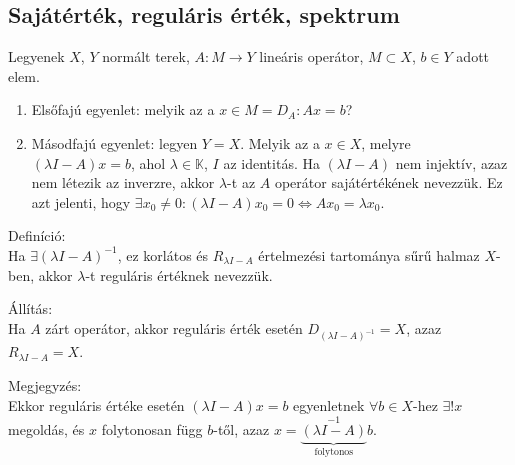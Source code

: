 \documentclass[12pt,a4paper]{scrartcl}
\providecommand{\tightlist}{%
  \setlength{\itemsep}{0pt}\setlength{\parskip}{0pt}}
\newenvironment{definicio}{}{}
\newenvironment{allitas}{}{}
\newenvironment{megjegyzes}{}{}
\begin{document}
\hypertarget{sajatertek-regularis-ertek-spektrum}{%
\subsection{Sajátérték, reguláris érték,
spektrum}\label{sajatertek-regularis-ertek-spektrum}}

Legyenek \(X\), \(Y\) normált terek, \(\left. A:M\rightarrow Y \right.\)
lineáris operátor, \(M \subset X\), \(b \in Y\) adott elem.

\begin{enumerate}
\def\labelenumi{\arabic{enumi}.}
\tightlist
\item
  Elsőfajú egyenlet: melyik az a \(x \in M = D_{A}:Ax = b\)?
\item
  Másodfajú egyenlet: legyen \(Y = X\). Melyik az a \(x \in X\), melyre
  \(\left( {\lambda I - A} \right)x = b\), ahol
  \(\lambda \in {\mathbb{K}}\), \(I\) az identitás. Ha
  \(\left( {\lambda I - A} \right)\) nem injektív, azaz nem létezik az
  inverzre, akkor \(\lambda\)-t az \(A\) operátor sajátértékének
  nevezzük. Ez azt jelenti, hogy
  \(\left. \exists x_{0} \neq 0:\left( {\lambda I - A} \right)x_{0} = 0\Leftrightarrow Ax_{0} = \lambda x_{0} \right.\).
\end{enumerate}

\begin{definicio}

Definíció:\\
Ha \(\exists\left( {\lambda I - A} \right)^{- 1}\), ez korlátos és
\(R_{\lambda I - A}\) értelmezési tartománya sűrű halmaz \(X\)-ben,
akkor \(\lambda\)-t reguláris értéknek nevezzük.

\end{definicio}

\begin{allitas}

Állítás:\\
Ha \(A\) zárt operátor, akkor reguláris érték esetén
\(D_{{({\lambda I - A})}^{- 1}} = X\), azaz \(R_{\lambda I - A} = X\).

\end{allitas}

\begin{megjegyzes}

Megjegyzés:\\
Ekkor reguláris értéke esetén \(\left( {\lambda I - A} \right)x = b\)
egyenletnek \(\forall b \in X\)-hez \(\exists!x\) megoldás, és \(x\)
folytonosan függ \(b\)-től, azaz
\(x = {\underbrace {\left( {\lambda I - A} \right)}_{{\text{folytonos}}}^{ - 1}}b\).

\end{megjegyzes}
\end{document}
